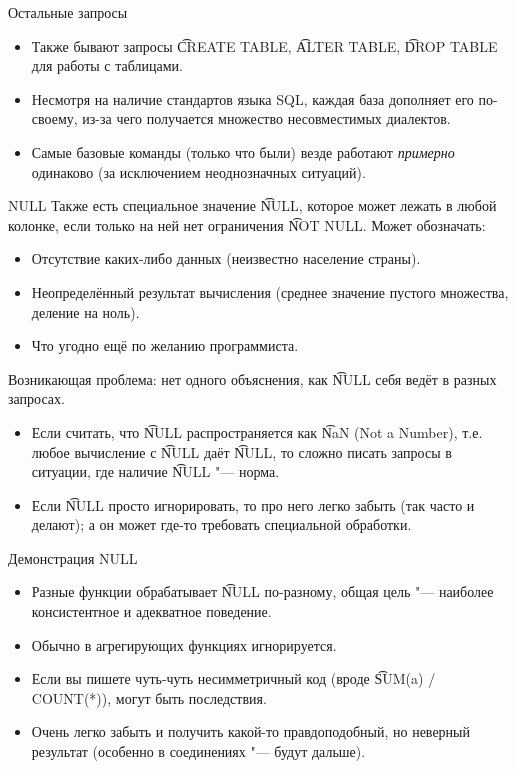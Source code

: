 \begin{frame}{Остальные запросы}
	\begin{itemize}
		\item Также бывают запросы \t{CREATE TABLE}, \t{ALTER TABLE}, \t{DROP TABLE} для работы с таблицами.
		\item Несмотря на наличие стандартов языка SQL, каждая база дополняет его по-своему,
			из-за чего получается множество несовместимых диалектов.
		\item Самые базовые команды (только что были) везде работают \textit{примерно} одинаково
			(за исключением неоднозначных ситуаций).
	\end{itemize}
\end{frame}

\begin{frame}{NULL}
	Также есть специальное значение \t{NULL}, которое может лежать в любой колонке, если только на ней нет ограничения \t{NOT NULL}.
	Может обозначать:
	\begin{itemize}
		\item Отсутствие каких-либо данных (неизвестно население страны).
		\item Неопределённый результат вычисления (среднее значение пустого множества, деление на ноль).
		\item Что угодно ещё по желанию программиста.
	\end{itemize}
	Возникающая проблема: нет одного объяснения, как \t{NULL} себя ведёт в разных запросах.
	\begin{itemize}
		\item
			Если считать, что \t{NULL} распространяется как \t{NaN} (Not a Number), т.е. любое вычисление с \t{NULL} даёт \t{NULL},
			то сложно писать запросы в ситуации, где наличие \t{NULL} "--- норма.
		\item
			Если \t{NULL} просто игнорировать, то про него легко забыть (так часто и делают); а он может где-то требовать специальной обработки.
	\end{itemize}
\end{frame}

\begin{frame}{Демонстрация NULL}
    \begin{itemize}
    	\item Разные функции обрабатывает \t{NULL} по-разному, общая цель "--- наиболее консистентное и адекватное поведение.
    	\item Обычно в агрегирующих функциях игнорируется.
    	\item Если вы пишете чуть-чуть несимметричный код (вроде \t{SUM(a) / COUNT(*)}), могут быть последствия.
    	\item Очень легко забыть и получить какой-то правдоподобный, но неверный результат (особенно в соединениях "--- будут дальше).
    \end{itemize}
\end{frame}
